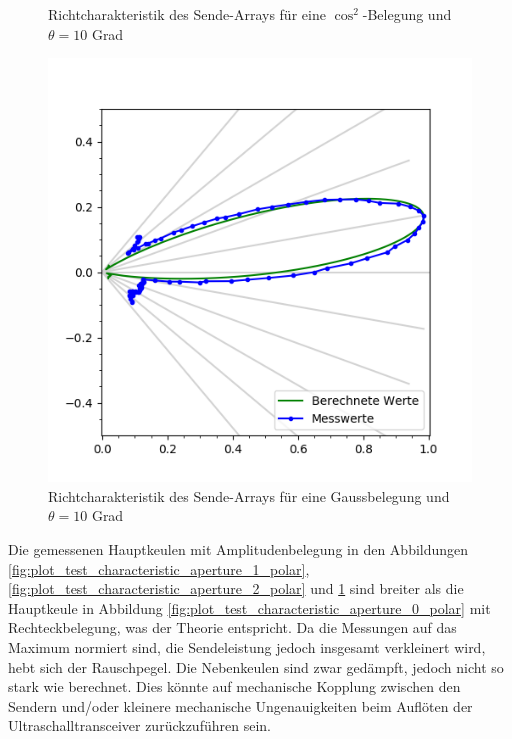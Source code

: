 \begin{figure}[htb]
\begin{minipage}{0.5\textwidth}
\caption{Richtcharakteristik des Sende-Arrays für eine $\cos^2$-Belegung und $\theta = 10$ Grad} %
\label{fig:plot_test_characteristic_aperture_2_polar}
%
\end{minipage}
\begin{minipage}{0.5\textwidth}
\includegraphics[width=\textwidth]{graphics/plot_test_characteristic_aperture_3_polar.png}
\caption{Richtcharakteristik des Sende-Arrays für eine Gaussbelegung und $\theta = 10$ Grad} %
\label{fig:plot_test_characteristic_aperture_3_polar}
%
\end{minipage}
\end{figure}

Die gemessenen Hauptkeulen mit Amplitudenbelegung in den Abbildungen \ref{fig:plot_test_characteristic_aperture_1_polar}, \ref{fig:plot_test_characteristic_aperture_2_polar} und \ref{fig:plot_test_characteristic_aperture_3_polar} sind breiter als die Hauptkeule in Abbildung \ref{fig:plot_test_characteristic_aperture_0_polar} mit Rechteckbelegung, was der Theorie entspricht. Da die Messungen auf das Maximum normiert sind, die Sendeleistung jedoch insgesamt verkleinert wird, hebt sich der Rauschpegel. Die Nebenkeulen sind zwar gedämpft, jedoch nicht so stark wie berechnet. Dies könnte auf mechanische Kopplung zwischen den Sendern und/oder kleinere mechanische Ungenauigkeiten beim Auflöten der Ultraschalltransceiver zurückzuführen sein.

